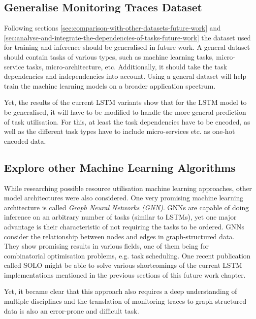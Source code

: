         \subsection{Generalise Monitoring Traces Dataset}
        \label{sec:generalise-dataset-future-work}

            Following sections \ref{sec:comparison-with-other-datasets-future-work} and \ref{sec:analyse-and-integrate-the-dependencies-of-tasks-future-work} the dataset used for training and inference should be generalised in future work. 
            A general dataset should contain tasks of various types, such as machine learning tasks, micro-service tasks, micro-architecture, etc.
            Additionally, it should take the task dependencies and independencies into account.
            Using a general dataset will help train the machine learning models on a broader application spectrum.

            Yet, the results of the current LSTM variants show that for the LSTM model to be generalised, it will have to be modified to handle the more general prediction of task utilisation. For this, at least the task dependencies have to be encoded, as well as the different task types have to include micro-services etc. as one-hot encoded data.
            
            

        \subsection{Explore other Machine Learning Algorithms}
        \label{sec:explore-other-machine-learning-algorithms-future-work}

            While researching possible resource utilisation machine learning approaches, other model architectures were also considered.
            One very promising machine learning architecture is called \emph{Graph Neural Networks (GNN)}.
            GNNs are capable of doing inference on an arbitrary number of tasks (similar to LSTMs), yet one major advantage is their characteristic of not requiring the tasks to be ordered. GNNs consider the relationship between nodes and edges in graph-structured data.
            They show promising results in various fields, one of them being for combinatorial optimisation problems, e.g. task scheduling.
            One recent publication called SOLO \cite{orenSOLOSearchOnline2021} might be able to solve various shortcomings of the current LSTM implementations mentioned in the previous sections of this future work chapter.

            Yet, it became clear that this approach also requires a deep understanding of multiple disciplines and the translation of monitoring traces to graph-structured data is also an error-prone and difficult task.



